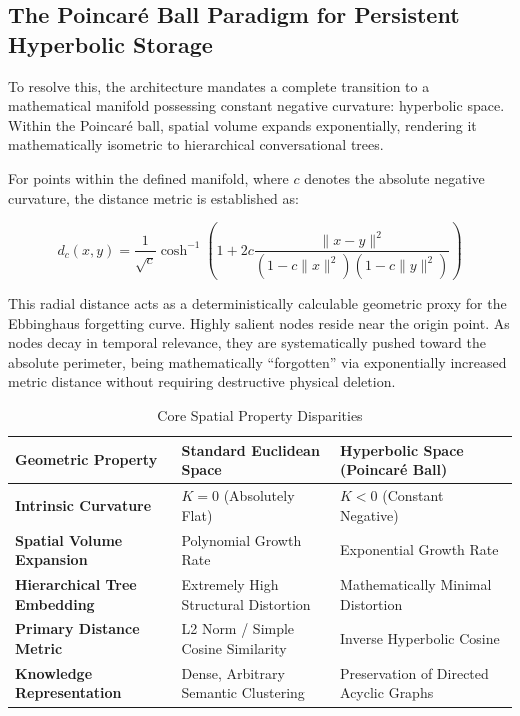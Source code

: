 \documentclass[11pt, a4paper]{article}
\begin{document}
	\subsection{The Poincaré Ball Paradigm for Persistent Hyperbolic Storage}
	To resolve this, the architecture mandates a complete transition to a mathematical manifold possessing constant negative curvature: hyperbolic space. Within the Poincaré ball, spatial volume expands exponentially, rendering it mathematically isometric to hierarchical conversational trees. 
	
	For points within the defined manifold, where $c$ denotes the absolute negative curvature, the distance metric is established as:
	
	\begin{equation}
		d_c(x,y) = \frac{1}{\sqrt{c}}\cosh^{-1}\left(1+2c\frac{\|x-y\|^2}{(1-c\|x\|^2)(1-c\|y\|^2)}\right)
	\end{equation}
	
	This radial distance acts as a deterministically calculable geometric proxy for the Ebbinghaus forgetting curve. Highly salient nodes reside near the origin point. As nodes decay in temporal relevance, they are systematically pushed toward the absolute perimeter, being mathematically ``forgotten'' via exponentially increased metric distance without requiring destructive physical deletion.

    \begin{table}[h]
    \centering
    \caption{Core Spatial Property Disparities}
    \vspace{0.2cm}
    \begin{tabularx}{\textwidth}{>{\hsize=1.2\hsize\bfseries}X >{\hsize=0.9\hsize}X >{\hsize=0.9\hsize}X}
    \toprule
    Geometric Property & Standard Euclidean Space & Hyperbolic Space (Poincaré Ball) \\
    \midrule
    Intrinsic Curvature & $K = 0$ (Absolutely Flat) & $K < 0$ (Constant Negative) \\
    Spatial Volume Expansion & Polynomial Growth Rate & Exponential Growth Rate \\
    Hierarchical Tree Embedding & Extremely High Structural Distortion & Mathematically Minimal Distortion \\
    Primary Distance Metric & L2 Norm / Simple Cosine Similarity & Inverse Hyperbolic Cosine \\
    Knowledge Representation & Dense, Arbitrary Semantic Clustering & Preservation of Directed Acyclic Graphs \\
    \bottomrule
    \end{tabularx}
    \end{table}
\end{document}
